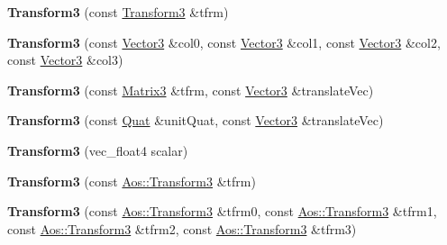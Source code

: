 \begin{DoxyCompactItemize}
\item 
\hypertarget{classVectormath_1_1Soa_1_1Transform3_a997c11a0588c48786b60f458bd049660}{{\bfseries Transform3} (const \hyperlink{classVectormath_1_1Soa_1_1Transform3}{Transform3} \&tfrm)}\label{classVectormath_1_1Soa_1_1Transform3_a997c11a0588c48786b60f458bd049660}

\item 
\hypertarget{classVectormath_1_1Soa_1_1Transform3_a788128c7fcd98464b5c11260759113bd}{{\bfseries Transform3} (const \hyperlink{classVectormath_1_1Soa_1_1Vector3}{Vector3} \&col0, const \hyperlink{classVectormath_1_1Soa_1_1Vector3}{Vector3} \&col1, const \hyperlink{classVectormath_1_1Soa_1_1Vector3}{Vector3} \&col2, const \hyperlink{classVectormath_1_1Soa_1_1Vector3}{Vector3} \&col3)}\label{classVectormath_1_1Soa_1_1Transform3_a788128c7fcd98464b5c11260759113bd}

\item 
\hypertarget{classVectormath_1_1Soa_1_1Transform3_aed3c1c9b8f3e0419676118ad9fe0eb04}{{\bfseries Transform3} (const \hyperlink{classVectormath_1_1Soa_1_1Matrix3}{Matrix3} \&tfrm, const \hyperlink{classVectormath_1_1Soa_1_1Vector3}{Vector3} \&translate\-Vec)}\label{classVectormath_1_1Soa_1_1Transform3_aed3c1c9b8f3e0419676118ad9fe0eb04}

\item 
\hypertarget{classVectormath_1_1Soa_1_1Transform3_a443f4e120c8a396af95a841e83dea628}{{\bfseries Transform3} (const \hyperlink{classVectormath_1_1Soa_1_1Quat}{Quat} \&unit\-Quat, const \hyperlink{classVectormath_1_1Soa_1_1Vector3}{Vector3} \&translate\-Vec)}\label{classVectormath_1_1Soa_1_1Transform3_a443f4e120c8a396af95a841e83dea628}

\item 
\hypertarget{classVectormath_1_1Soa_1_1Transform3_a825327a042ddd95dd7f1cefb9ae30451}{{\bfseries Transform3} (vec\-\_\-float4 scalar)}\label{classVectormath_1_1Soa_1_1Transform3_a825327a042ddd95dd7f1cefb9ae30451}

\item 
\hypertarget{classVectormath_1_1Soa_1_1Transform3_aa7487f322952ccdba2dff476e55d939a}{{\bfseries Transform3} (const \hyperlink{classVectormath_1_1Aos_1_1Transform3}{Aos\-::\-Transform3} \&tfrm)}\label{classVectormath_1_1Soa_1_1Transform3_aa7487f322952ccdba2dff476e55d939a}

\item 
\hypertarget{classVectormath_1_1Soa_1_1Transform3_a998f5d5a93356096912a73dd77d5d629}{{\bfseries Transform3} (const \hyperlink{classVectormath_1_1Aos_1_1Transform3}{Aos\-::\-Transform3} \&tfrm0, const \hyperlink{classVectormath_1_1Aos_1_1Transform3}{Aos\-::\-Transform3} \&tfrm1, const \hyperlink{classVectormath_1_1Aos_1_1Transform3}{Aos\-::\-Transform3} \&tfrm2, const \hyperlink{classVectormath_1_1Aos_1_1Transform3}{Aos\-::\-Transform3} \&tfrm3)}\label{classVectormath_1_1Soa_1_1Transform3_a998f5d5a93356096912a73dd77d5d629}


\end{DoxyCompactItemize}
